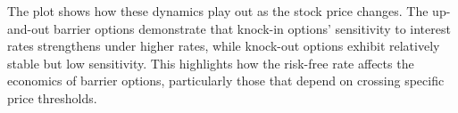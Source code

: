 The plot shows how these dynamics play out as the stock price changes. The up-and-out barrier options demonstrate that knock-in options' sensitivity to interest rates strengthens under higher rates, while knock-out options exhibit relatively stable but low sensitivity. This highlights how the risk-free rate affects the economics of barrier options, particularly those that depend on crossing specific price thresholds.
